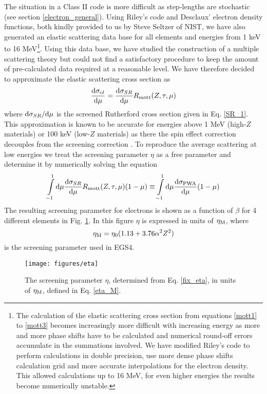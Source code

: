 The situation in a Class II code is more difficult as step-lengths
are stochastic (see section \ref{electron_general}).
Using Riley's code and Desclaux' electron
density functions, both kindly provided to us by Steve Seltzer of NIST,
we have also generated an elastic scattering data
base for all elements and energies from 1 keV to 16 MeV\footnote{
The calculation of the elastic scattering cross section from
equations \eqref{mott1} to \eqref{mott3} becomes increasingly
more difficult with increasing energy as more and more phase
shifts have to be calculated and numerical round-off errors
accumulate in the summations involved. We have modified Riley's
code to perform calculations in double precision, use more dense phase
shifts calculation grid and more accurate interpolations for
the electron density. This allowed calculations up to 16 MeV, for
even higher energies the results become numerically unstable.}.
Using this data base, we have studied the construction of a multiple
scattering theory but could not find a satisfactory procedure
to keep the amount of pre-calculated data required at a reasonable level.
We have therefore decided to approximate the elastic scattering
cross section as
\begin{equation}
\label{sigma_el}
{{\rm d}\sigma_{el} \over {\rm d}\mu} = {{\rm d}\sigma_{SR} \over {\rm d}\mu}
R_{\rm mott}(Z,\tau,\mu)
\end{equation}
where ${\rm d}\sigma_{SR}/{\rm d}\mu$ is the screened Rutherford cross
section given in Eq. \eqref{SR_1}. This approximation is known
to be accurate for energies above 1 MeV (high-$Z$ materials) or
100 keV (low-$Z$ materials) as there the spin effect correction
decouples from the screening correction \cite{BW89}. To
reproduce the average scattering at low energies we treat
the screening parameter $\eta$ as a free parameter and determine
it by numerically solving the equation
\begin{equation}
\label{fix_eta}
\int\limits_{-1}^1 {\rm d} \mu {{\rm d}\sigma_{SR} \over {\rm d}\mu}
R_{\rm mott}(Z,\tau,\mu) (1 - \mu) \equiv
\int\limits_{-1}^1 {\rm d} \mu {{\rm d}\sigma_{\rm PWA} \over {\rm d} \mu}
(1 - \mu)
\end{equation}
The resulting screening parameter for electrons is shown
as a function of $\beta$ for 4 different elements in
Fig. \ref{fig_eta}. In this figure $\eta$ is expressed in units
of $\eta_{\rm M}$, where
\begin{equation}
\label{eta_M}
\eta_{\rm M} = \eta_0 (1.13 + 3.76 \alpha^2 Z^2)
\end{equation}
is the screening parameter used in EGS4.
\begin{figure}[htp]
\texttt{[image: figures/eta]}
\caption[Screening parameter]{\label{fig_eta} The screening parameter $\eta$,
determined from Eq. \protect\eqref{fix_eta}, in units of
$\eta_{\rm M}$, defined in Eq. \protect\eqref{eta_M}.}
\end{figure}

